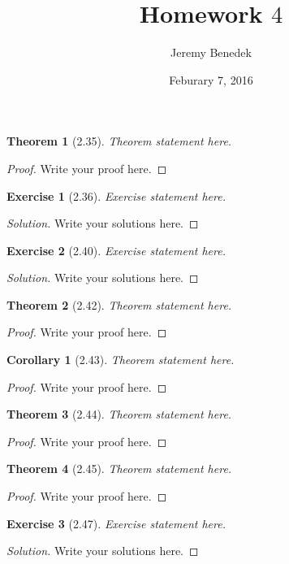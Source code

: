 \documentclass{article}
\title{Homework $4$}
\author{Jeremy Benedek}
\date{Feburary 7, 2016}
\newtheorem*{thm}{Theorem}
\newtheorem*{ex}{Exercise}
\newtheorem*{cor}{Corollary}
\newenvironment{solution}
  {\begin{proof}[Solution]}
  {\renewcommand{\qedsymbol}{}\end{proof}}
\begin{document}
\maketitle

\begin{thm}[2.35]
    Theorem statement here.
\end{thm}
\begin{proof}
    Write your proof here.
\end{proof}

\begin{ex}[2.36]
    Exercise statement here.
\end{ex}
\begin{solution}
    Write your solutions here.
\end{solution}

\begin{ex}[2.40]
    Exercise statement here.
\end{ex}
\begin{solution}
    Write your solutions here.
\end{solution}

\begin{thm}[2.42]
    Theorem statement here.
\end{thm}
\begin{proof}
    Write your proof here.
\end{proof}

\begin{cor}[2.43]
    Theorem statement here.
  \end{cor}
\begin{proof}
    Write your proof here.
\end{proof}

\begin{thm}[2.44]
    Theorem statement here.
\end{thm}
\begin{proof}
    Write your proof here.
\end{proof}

\begin{thm}[2.45]
    Theorem statement here.
\end{thm}
\begin{proof}
    Write your proof here.
\end{proof}

\begin{ex}[2.47]
    Exercise statement here.
\end{ex}
\begin{solution}
    Write your solutions here.
\end{solution}
\end{document}
